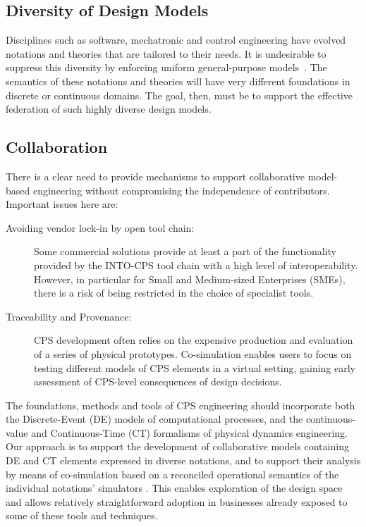 \subsection{Diversity of Design Models}

Disciplines such as software, mechatronic and control engineering have evolved notations and theories that are tailored to their needs. It is undesirable to suppress this diversity by enforcing uniform general-purpose models~\cite{Fitzgerald&15,Larsen&16e}. The semantics of these notations and theories will have very different foundations in discrete or continuous domains. The goal, then, must be to support the effective federation of such highly diverse design models.

\subsection{Collaboration}

There is a clear need to provide mechanisms to support collaborative model-based engineering without compromising the independence of contributors. Important issues here are:
\begin{description}
\item[Avoiding vendor lock-in by open tool chain:] Some commercial solutions provide at least a part of the functionality provided by the INTO-CPS tool chain with a high level of interoperability. However, in particular for Small and Medium-sized Enterprises (SMEs), there is a risk of being restricted in the choice of specialist tools.
\item[Traceability and Provenance:] CPS development often relies on the expensive production and evaluation of a series of physical prototypes. Co-simulation enables users to focus on testing different models of CPS elements in a virtual setting, gaining early assessment of CPS-level consequences of design decisions.
\end{description}

The foundations, methods and tools of CPS engineering should incorporate both the Discrete-Event (DE) models of computational processes, and the continuous-value and Continuous-Time (CT) formalisms of physical dynamics engineering. Our approach is to support the development of collaborative models containing DE and CT elements expressed in diverse notations, and to support their analysis by means of co-simulation based on a reconciled operational semantics of the individual notations' simulators \cite{Fitzgerald&14c}. This enables exploration of the design space and allows relatively straightforward adoption in businesses already exposed to some of these tools and techniques. 

